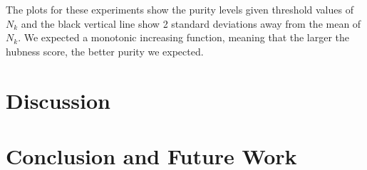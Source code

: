 \documentclass[graybox]{svmult}
\begin{document}
The plots for these experiments show the purity levels given threshold values of $N_k$ and the black vertical line show 2 standard deviations away from the mean of $N_k$. We expected a monotonic increasing function, meaning that the larger the hubness score, the better purity we expected.



\section{Discussion}
\label{sec:5}



\section{Conclusion and Future Work}
\label{sec:6}

%
\end{document}
